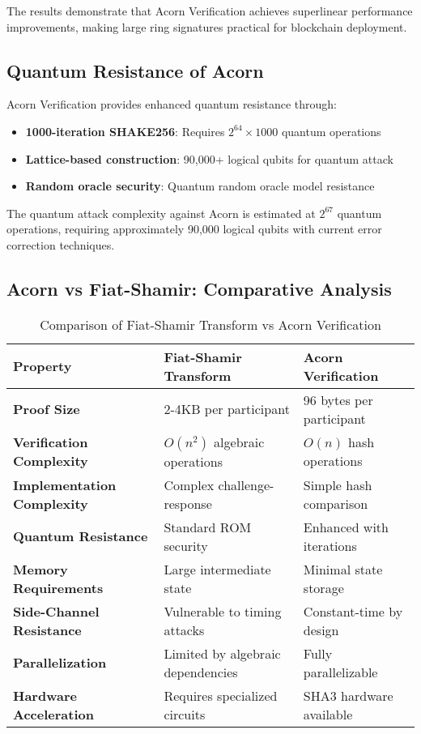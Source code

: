 \documentclass[11pt,a4paper]{article}
\begin{document}
The results demonstrate that Acorn Verification achieves superlinear performance improvements, making large ring signatures practical for blockchain deployment.

\subsection{Quantum Resistance of Acorn}

Acorn Verification provides enhanced quantum resistance through:

\begin{itemize}
\item \textbf{1000-iteration SHAKE256}: Requires $2^{64} \times 1000$ quantum operations
\item \textbf{Lattice-based construction}: 90,000+ logical qubits for quantum attack
\item \textbf{Random oracle security}: Quantum random oracle model resistance
\end{itemize}

The quantum attack complexity against Acorn is estimated at $2^{67}$ quantum operations, requiring approximately 90,000 logical qubits with current error correction techniques.

\subsection{Acorn vs Fiat-Shamir: Comparative Analysis}

\begin{table}[h]
\centering
\begin{tabular}{@{}lll@{}}
\toprule
Property & Fiat-Shamir Transform & Acorn Verification \\
\midrule
\textbf{Proof Size} & 2-4KB per participant & 96 bytes per participant \\
\textbf{Verification Complexity} & $O(n^2)$ algebraic operations & $O(n)$ hash operations \\
\textbf{Implementation Complexity} & Complex challenge-response & Simple hash comparison \\
\textbf{Quantum Resistance} & Standard ROM security & Enhanced with iterations \\
\textbf{Memory Requirements} & Large intermediate state & Minimal state storage \\
\textbf{Side-Channel Resistance} & Vulnerable to timing attacks & Constant-time by design \\
\textbf{Parallelization} & Limited by algebraic dependencies & Fully parallelizable \\
\textbf{Hardware Acceleration} & Requires specialized circuits & SHA3 hardware available \\
\bottomrule
\end{tabular}
\caption{Comparison of Fiat-Shamir Transform vs Acorn Verification}
\label{tab:acorn-vs-fiat-shamir}
\end{table}
\end{document}
